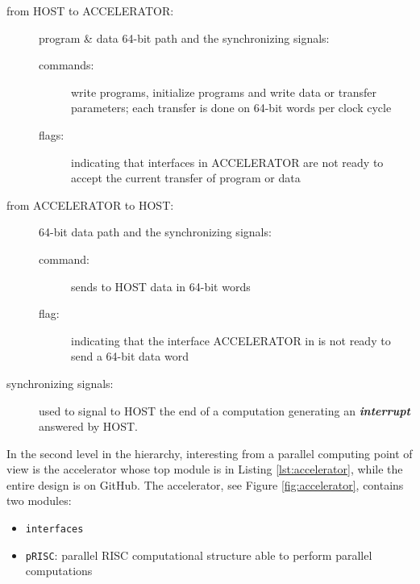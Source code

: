 \begin{description}
    \item[from HOST to ACCELERATOR:] program \& data 64-bit path and the synchronizing signals:
        \begin{description}
            \item[commands:] write programs, initialize programs and write data or transfer parameters; each transfer is done on 64-bit words per clock cycle
            \item[flags:] indicating that interfaces in ACCELERATOR are not ready to accept the current transfer of program or data
        \end{description}
    \item[from ACCELERATOR to HOST:] 64-bit data path and the synchronizing signals:
        \begin{description}
            \item[command:] sends to HOST data in 64-bit words
            \item[flag:] indicating that the interface ACCELERATOR in is not ready to send a 64-bit data word 
        \end{description}
    \item[synchronizing signals:] used to signal to  HOST the end of a computation generating an {\bf {\em interrupt}} answered by HOST. 
\end{description}



In the second level in the hierarchy, interesting from a parallel computing point of view is the accelerator whose top module is in Listing \ref{lst:accelerator}, while the entire design is on GitHub. The accelerator, see Figure \ref{fig:accelerator}, contains two modules:
\begin{itemize}
    \item {\tt interfaces}
    \item {\tt pRISC}: parallel RISC computational structure able to perform parallel computations
\end{itemize}

